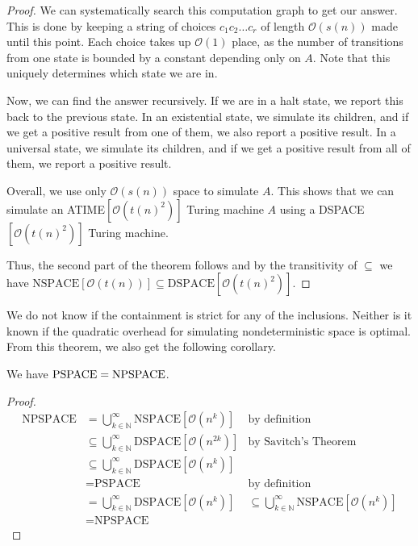 \begin{proof}
    We can systematically search this computation graph to get our answer.
    This is done by keeping a string of choices $c_{1}c_{2}\dots c_r$ of length $\mathcal{O}(s(n))$ made until this point.
    Each choice takes up $\mathcal{O}(1)$ place, as the number of transitions from one state is bounded by a constant depending only on $A$.
    Note that this uniquely determines which state we are in.

    Now, we can find the answer recursively.
    If we are in a halt state, we report this back to the previous state.
    In an existential state, we simulate its children, and if we get a positive result from one of them, we also report a positive result.
    In a universal state, we simulate its children, and if we get a positive result from all of them, we report a positive result.

    Overall, we use only $\mathcal{O}(s(n))$ space to simulate $A$.
    This shows that we can simulate an ATIME$[\mathcal{O}(t(n)^2)]$ Turing machine $A$ using a DSPACE$[\mathcal{O}(t(n)^2)]$ Turing machine.

    Thus, the second part of the theorem follows and by the transitivity of $\subseteq$ we have $\text{NSPACE}[\mathcal{O}(t(n))] \subseteq \text{DSPACE}[\mathcal{O}(t(n)^2)]$.
\end{proof}

We do not know if the containment is strict for any of the inclusions.
Neither is it known if the quadratic overhead for simulating nondeterministic space is optimal.
From this theorem, we also get the following corollary.

\begin{corollary}
    We have $\text{\upshape PSPACE} = \text{\upshape NPSPACE}$.
\end{corollary}

\begin{proof}
    \begin{align*}
        \text{NPSPACE} &= \bigcup_{k \in \mathbb{N}}^{\infty}\text{NSPACE}[\mathcal{O}(n^k)] & \text{by definition} \\
        &\subseteq \bigcup_{k\in \mathbb{N}}^{\infty}\text{DSPACE}[\mathcal{O}(n^{2k})] & \text{by Savitch's Theorem} \\
        &\subseteq \bigcup_{k\in \mathbb{N}}^{\infty}\text{DSPACE}[\mathcal{O}(n^{k})] \\
        &= \text{PSPACE} & \text{by definition} \\
        &= \bigcup_{k\in \mathbb{N}}^{\infty}\text{DSPACE}[\mathcal{O}(n^{k})]
        &\subseteq \bigcup_{k\in \mathbb{N}}^{\infty}\text{NSPACE}[\mathcal{O}(n^{k})] \\
        &= \text{NPSPACE}
    \end{align*}
\end{proof}


